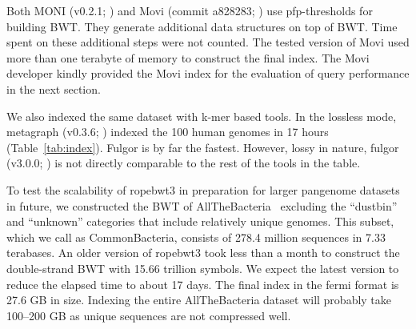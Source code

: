 \documentclass[webpdf,contemporary,large,namedate]{oup-authoring-template}%
\begin{document}
Both MONI (v0.2.1; \citealt*{Rossi:2022aa}) and Movi (commit a828283; \citealt*{Zakeri:2024aa}) use pfp-thresholds for building BWT.
They generate additional data structures on top of BWT.
Time spent on these additional steps were not counted.
The tested version of Movi used more than one terabyte of memory to construct the final index.
The Movi developer kindly provided the Movi index for the evaluation of query performance in the next section.

We also indexed the same dataset with k-mer based tools.
In the lossless mode, metagraph (v0.3.6; \citealt*{Karasikov2020.10.01.322164}) indexed the 100 human genomes in 17 hours (Table~\ref{tab:index}).
Fulgor is by far the fastest.
However, lossy in nature, fulgor (v3.0.0; \citealt*{Fan:2024aa}) is not directly comparable to the rest of the tools in the table.

To test the scalability of ropebwt3 in preparation for larger pangenome datasets in future,
we constructed the BWT of AllTheBacteria~\citep{Hunt2024.03.08.584059} excluding the ``dustbin'' and ``unknown'' categories that include relatively unique genomes.
This subset, which we call as CommonBacteria, consists of 278.4 million sequences in 7.33 terabases.
An older version of ropebwt3 took less than a month to construct the double-strand BWT with 15.66 trillion symbols.
We expect the latest version to reduce the elapsed time to about 17 days.
The final index in the fermi format is 27.6 GB in size.
Indexing the entire AllTheBacteria dataset will probably take 100--200 GB as unique sequences are not compressed well.
\end{document}
